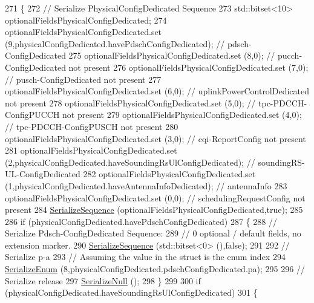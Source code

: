 \begin{DoxyCode}
271 \{
272   \textcolor{comment}{// Serialize PhysicalConfigDedicated Sequence}
273   std::bitset<10> optionalFieldsPhysicalConfigDedicated;
274   optionalFieldsPhysicalConfigDedicated.set (9,physicalConfigDedicated.havePdschConfigDedicated);  \textcolor{comment}{//
       pdsch-ConfigDedicated}
275   optionalFieldsPhysicalConfigDedicated.set (8,0);  \textcolor{comment}{// pucch-ConfigDedicated not present}
276   optionalFieldsPhysicalConfigDedicated.set (7,0);  \textcolor{comment}{// pusch-ConfigDedicated not present}
277   optionalFieldsPhysicalConfigDedicated.set (6,0);  \textcolor{comment}{// uplinkPowerControlDedicated not present}
278   optionalFieldsPhysicalConfigDedicated.set (5,0);  \textcolor{comment}{// tpc-PDCCH-ConfigPUCCH not present}
279   optionalFieldsPhysicalConfigDedicated.set (4,0);  \textcolor{comment}{// tpc-PDCCH-ConfigPUSCH not present}
280   optionalFieldsPhysicalConfigDedicated.set (3,0);  \textcolor{comment}{// cqi-ReportConfig not present}
281   optionalFieldsPhysicalConfigDedicated.set (2,physicalConfigDedicated.haveSoundingRsUlConfigDedicated);  \textcolor{comment}{
      // soundingRS-UL-ConfigDedicated}
282   optionalFieldsPhysicalConfigDedicated.set (1,physicalConfigDedicated.haveAntennaInfoDedicated);  \textcolor{comment}{//
       antennaInfo}
283   optionalFieldsPhysicalConfigDedicated.set (0,0);  \textcolor{comment}{// schedulingRequestConfig not present}
284   \hyperlink{classns3_1_1Asn1Header_aa9744858380443ed95836fed08799aed}{SerializeSequence} (optionalFieldsPhysicalConfigDedicated,\textcolor{keyword}{true});
285 
286   \textcolor{keywordflow}{if} (physicalConfigDedicated.havePdschConfigDedicated)
287     \{
288       \textcolor{comment}{// Serialize Pdsch-ConfigDedicated Sequence:}
289       \textcolor{comment}{// 0 optional / default fields, no extension marker.}
290       \hyperlink{classns3_1_1Asn1Header_aa9744858380443ed95836fed08799aed}{SerializeSequence} (std::bitset<0> (),\textcolor{keyword}{false});
291 
292       \textcolor{comment}{// Serialize  p-a}
293       \textcolor{comment}{// Assuming the value in the struct is the enum index}
294       \hyperlink{classns3_1_1Asn1Header_ac8e56956823ab8e4470c09e162e7bf24}{SerializeEnum} (8,physicalConfigDedicated.pdschConfigDedicated.pa);
295 
296       \textcolor{comment}{// Serialize release}
297       \hyperlink{classns3_1_1Asn1Header_ad1814fa357d2148457d7e4ade1ab84a8}{SerializeNull} ();
298     \}
299 
300   \textcolor{keywordflow}{if} (physicalConfigDedicated.haveSoundingRsUlConfigDedicated)
301     \{

\end{DoxyCode}
